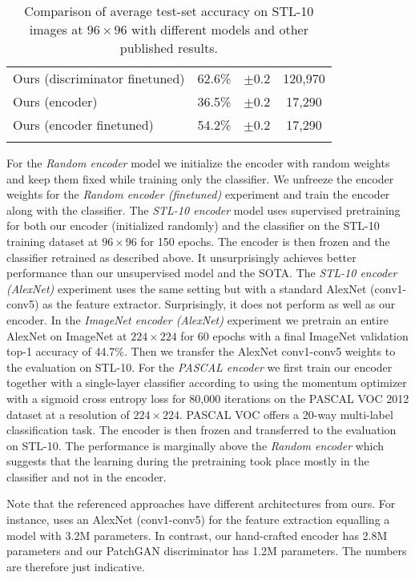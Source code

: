 \documentclass[12pt,a4paper]{article}
\begin{document}
\begin{table}[ht!]
\begin{tabular}{l c c|c}
Ours (discriminator finetuned) & 62.6\%  & $\pm$0.2 & 120,970 \\ %
Ours (encoder) & 36.5\%  & $\pm$0.2 & 17,290 \\ %
Ours (encoder finetuned) & 54.2\% & $\pm$0.2 & 17,290 \\ %
\Xhline{0.8pt}
\end{tabular}
\caption{Comparison of average test-set accuracy on STL-10 images at $96 \times 96$ with different models and other published results.} \label{tab:comparison_stl10}
\end{table}
For the \textit{Random encoder} model we initialize the encoder with random weights and keep them fixed while training only the classifier. We unfreeze the encoder weights for the \textit{Random encoder (finetuned)} experiment and train the encoder along with the classifier. The \textit{STL-10 encoder} model uses supervised pretraining for both our encoder (initialized randomly) and the classifier on the STL-10 training dataset at $96 \times 96$ for 150 epochs. The encoder is then frozen and the classifier retrained as described above. It unsurprisingly achieves better performance than our unsupervised model and the SOTA. The \textit{STL-10 encoder (AlexNet)} experiment uses the same setting but with a standard AlexNet (conv1-conv5) as the feature extractor. Surprisingly, it does not perform as well as our encoder. In the \textit{ImageNet encoder (AlexNet)} experiment we pretrain an entire AlexNet on ImageNet at $224 \times 224$ for 60 epochs with a final ImageNet validation top-1 accuracy of 44.7\%. Then we transfer the AlexNet conv1-conv5 weights to the evaluation on STL-10. For the \textit{PASCAL encoder} we first train our encoder together with a single-layer classifier according to \cite{PascalVocTraining} using the momentum optimizer with a sigmoid cross entropy loss for 80,000 iterations on the PASCAL VOC 2012 dataset at a resolution of $224 \times 224$. PASCAL VOC offers a 20-way multi-label classification task. The encoder is then frozen and transferred to the evaluation on STL-10. The performance is marginally above the \textit{Random encoder} which suggests that the learning during the pretraining took place mostly in the classifier and not in the encoder.

Note that the referenced approaches have different architectures from ours. For instance, \cite{SpotArtifacts} uses an AlexNet (conv1-conv5) for the feature extraction equalling a model with 3.2M parameters. In contrast, our hand-crafted encoder has 2.8M parameters and our PatchGAN discriminator has 1.2M parameters. The numbers are therefore just indicative.
\end{document}
